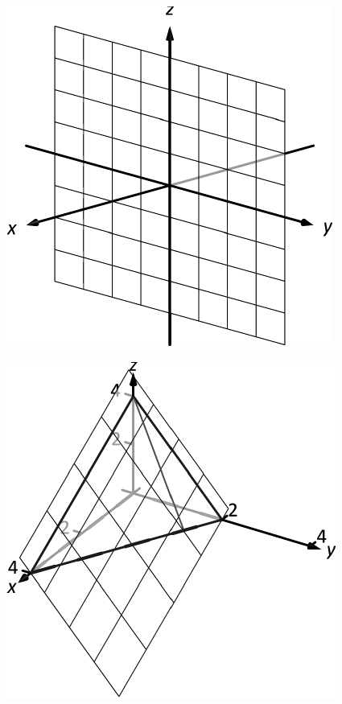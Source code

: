 \documentclass[10pt]{article}
\begin{document}
\includegraphics{figspaceyz_3DBW.pdf}
\texttt{}

\includegraphics{figsurfacearea1_3DBW.pdf}
\texttt{}
\end{document}
